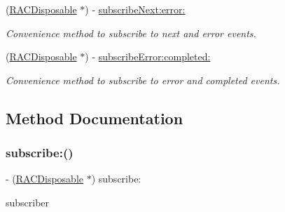\begin{DoxyCompactItemize}
\item 
\mbox{\label{category_r_a_c_signal_07_subscription_08_a2fc221c95206c024d074a23cf7efc480}} 
(\mbox{\hyperlink{interface_r_a_c_disposable}{R\+A\+C\+Disposable}} $\ast$) -\/ \mbox{\hyperlink{category_r_a_c_signal_07_subscription_08_a2fc221c95206c024d074a23cf7efc480}{subscribe\+Next\+:error\+:}}
\begin{DoxyCompactList}\small\item\em Convenience method to subscribe to {\ttfamily next} and {\ttfamily error} events. \end{DoxyCompactList}\item 
\mbox{\label{category_r_a_c_signal_07_subscription_08_aad432a4ebbe885ea4bb606097a60e474}} 
(\mbox{\hyperlink{interface_r_a_c_disposable}{R\+A\+C\+Disposable}} $\ast$) -\/ \mbox{\hyperlink{category_r_a_c_signal_07_subscription_08_aad432a4ebbe885ea4bb606097a60e474}{subscribe\+Error\+:completed\+:}}
\begin{DoxyCompactList}\small\item\em Convenience method to subscribe to {\ttfamily error} and {\ttfamily completed} events. \end{DoxyCompactList}\end{DoxyCompactItemize}


\subsection{Method Documentation}
\mbox{\label{category_r_a_c_signal_07_subscription_08_aeab76d632d98bbc321ec5e19575377eb}} 
\subsubsection{\texorpdfstring{subscribe\+:()}{subscribe:()}\hspace{0.1cm}{\footnotesize\ttfamily [1/3]}}
{\footnotesize\ttfamily -\/ (\mbox{\hyperlink{interface_r_a_c_disposable}{R\+A\+C\+Disposable}} $\ast$) subscribe\+: \begin{DoxyParamCaption}\item[{(id$<$ \mbox{\hyperlink{interface_r_a_c_subscriber}{R\+A\+C\+Subscriber}} $>$)}]{subscriber }\end{DoxyParamCaption}}


